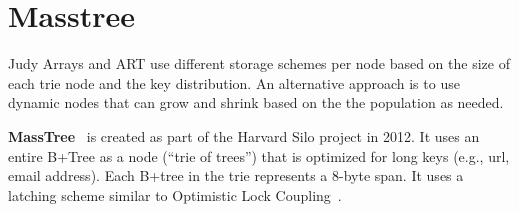 \documentclass[11pt]{article}
\begin{document}
\section{Masstree}
Judy Arrays and ART use different storage schemes per node based on the size of each trie node and the key distribution. An alternative approach is to use dynamic nodes that can grow and shrink based on the the population as needed. 

\textbf{MassTree}~\cite{Mao:2012:CCF:2168836.2168855} is created as part of the Harvard Silo project in 2012. It uses an entire B+Tree as a node (``trie of trees'') that is optimized for long keys (e.g., url, email address). Each B+tree in the trie represents a 8-byte span. It uses a latching scheme similar to Optimistic Lock Coupling~\cite{Leis}.

\newpage


\end{document}
